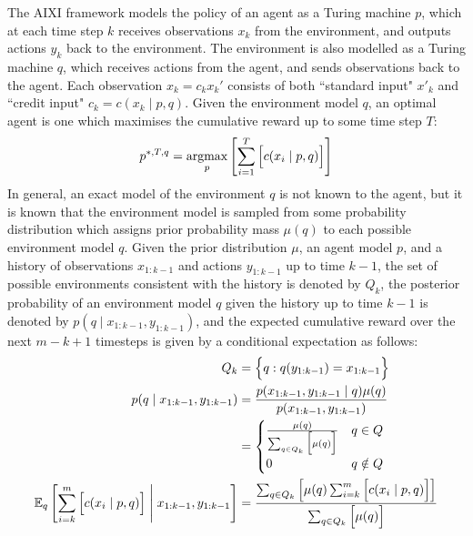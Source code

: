 The AIXI framework \cite{hutter2000theory} models the policy of an agent as a Turing machine $p$, which at each time step $k$ receives observations $x_k$ from the environment, and outputs actions $y_k$ back to the environment. The environment is also modelled as a Turing machine $q$, which receives actions from the agent, and sends observations back to the agent. Each observation $x_k=c_kx_k'$ consists of both ``standard input" $x'_k$ and ``credit input" $c_k=c(x_k \mid p, q)$. Given the environment model $q$, an optimal agent is one which maximises the cumulative reward up to some time step $T$:
\begin{equation*}
    p^{*,T,q} = \underset{p}{\operatorname{argmax}}\left[ \sum_{i=1}^T{\Bigl[ c(x_i \mid p, q) \Bigr]} \right]
\end{equation*}
In general, an exact model of the environment $q$ is not known to the agent, but it is known that the environment model is sampled from some probability distribution which assigns prior probability mass $\mu(q)$ to each possible environment model $q$. Given the prior distribution $\mu$, an agent model $p$, and a history of observations $x_{1:k-1}$ and actions $y_{1:k-1}$ up to time $k-1$, the set of possible environments consistent with the history is denoted by $Q_k$, the posterior probability of an environment model $q$ given the history up to time $k-1$ is denoted by $p(q\mid x_{1:k-1}, y_{1:k-1})$, and the expected cumulative reward over the next $m-k+1$ timesteps is given by a conditional expectation as follows:
\begin{align*}
    Q_k &= \Bigl\{ q:q(y_{1:k-1}) = x_{1:k-1} \Bigr\} \\
    p(q\mid x_{1:k-1}, y_{1:k-1}) &= \frac{p(x_{1:k-1}, y_{1:k-1}\mid q)\mu(q)}{p(x_{1:k-1}, y_{1:k-1})} \\
    &= \begin{cases}
        \frac{\mu(q)}{\sum_{q\in Q_k}{\Bigl[ \mu(q) \Bigr]}} & q\in Q \\
        0 & q\notin Q \\
    \end{cases} \\
    \mathbb{E}_q\left[ \sum_{i=k}^{m}{\Bigl[ c(x_i \mid p, q) \Bigr]} \;\middle\vert\; x_{1:k-1}, y_{1:k-1} \right] &= \frac{\sum_{q\in Q_k}{\left[ \mu(q) \sum_{i=k}^{m}{\Bigl[ c(x_i \mid p, q) \Bigr]} \right]}}{\sum_{q\in Q_k}{\Bigl[ \mu(q) \Bigr]}}
\end{align*}
\pagebreak

